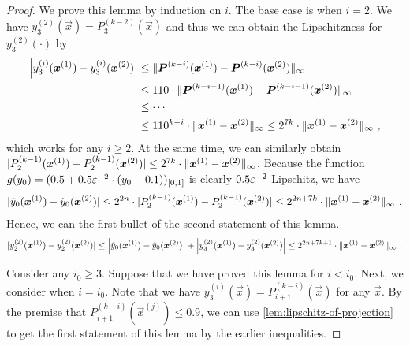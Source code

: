 \begin{proof}
    We prove this lemma by induction on $i$. The base case is when $i=2$. 
    We have $y^{(2)}_3(\vec{x})=P_3^{(k-2)}(\vec{x})$ and thus we can obtain the Lipschitzness for $y^{(2)}_3(\cdot)$ by
    \begin{align*}
        \left |{y_3^{(i)}(\boldsymbol{x}^{(1)})-y_3^{(i)}(\boldsymbol{x}^{(2)})} \right |
        &\leq 
        \| {\boldsymbol{P}^{(k-i)}(\boldsymbol{x}^{(1)})-\boldsymbol{P}^{(k-i)}(\boldsymbol{x}^{(2)})} \|_{\infty}
        \\
        &\leq 
        110\cdot \| {\boldsymbol{P}^{(k-i-1)}(\boldsymbol{x}^{(1)})-\boldsymbol{P}^{(k-i-1)}(\boldsymbol{x}^{(2)})} \|_{\infty}
        \\
        &\leq
        \cdots
        \\
        &\leq 
        110^{k-i}\cdot \| {\boldsymbol{x}^{(1)}-\boldsymbol{x}^{(2)}} \|_{\infty}
        \leq 2^{7k}\cdot \| {\boldsymbol{x}^{(1)}-\boldsymbol{x}^{(2)}} \|_{\infty}~,
    \end{align*}
    which works for any $i\geq 2$. 
    At the same time, we can similarly obtain $|{P_2^{(k-1)}(\boldsymbol{x}^{(1)})-P_2^{(k-1)}(\boldsymbol{x}^{(2)})} |\leq 2^{7k}\cdot \| {\boldsymbol{x}^{(1)}-\boldsymbol{x}^{(2)}} \|_{\infty}$. 
    Because the function $g(y_0)=(0.5+0.5\varepsilon^{-2}\cdot (y_0-0.1))_{[0,1]}$ is clearly $0.5\varepsilon^{-2}$-Lipschitz, we have
    \begin{align*}
        |{\tilde{y}_0(\boldsymbol{x}^{(1)}) - \tilde{y}_0(\boldsymbol{x}^{(2)})} | \leq 2^{2n} \cdot |{P_2^{(k-1)}(\boldsymbol{x}^{(1)})-P_2^{(k-1)}(\boldsymbol{x}^{(2)})} | \leq 2^{2n+7k} \cdot \| {\boldsymbol{x}^{(1)}-\boldsymbol{x}^{(2)}} \|_{\infty}~.
    \end{align*}
    Hence, we can the first bullet of the second statement of this lemma. 
    \begin{align*}
        |{y_2^{(2)}(\boldsymbol{x}^{(1)}) - y_2^{(2)}(\boldsymbol{x}^{(2)})} | \leq \left |{\tilde{y}_0(\boldsymbol{x}^{(1)})-\tilde{y}_0(\boldsymbol{x}^{(2)})} \right | + \left |{y^{(2)}_3(\boldsymbol{x}^{(1)})-y^{(2)}_3(\boldsymbol{x}^{(2)})} \right | \leq 2^{2n+7k+1}\cdot \| {\boldsymbol{x}^{(1)}-\boldsymbol{x}^{(2)}} \|_{\infty}~.
    \end{align*}

    Consider any $i_0\geq 3$. 
    Suppose that we have proved this lemma for $i<i_0$. 
    Next, we consider when $i=i_0$.
    Note that we have $y_3^{(i)}(\vec{x})=P_{i+1}^{(k-i)}(\vec{x})$ for any $\vec{x}$.
    By the premise that $P_{i+1}^{(k-i)}(\vec{x}^{(j)})\leq 0.9$, we can use \cref{lem:lipschitz-of-projection} to get
    the first statement of this lemma by the earlier inequalities. 


\end{proof}
